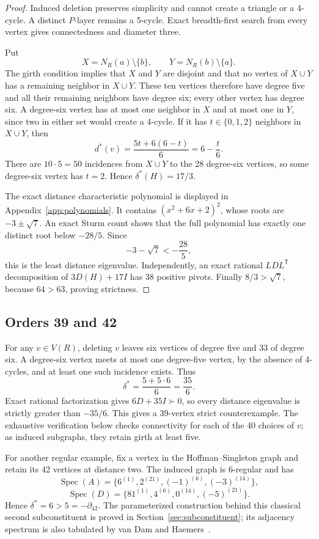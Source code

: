 \documentclass[a4paper,11pt,reqno]{amsart}
\theoremstyle{plain}
\theoremstyle{definition}
\theoremstyle{remark}
\newcommand{\Spec}{\operatorname{Spec}}
\begin{document}
\begin{proof}
Induced deletion preserves simplicity and cannot create a triangle or a
4-cycle.  A distinct \(P\)-layer remains a 5-cycle.  Exact breadth-first
search from every vertex gives connectedness and diameter three.

Put
\[
 X=N_R(a)\setminus\{b\},\qquad
 Y=N_R(b)\setminus\{a\}.
\]
The girth condition implies that \(X\) and \(Y\) are disjoint and that no
vertex of \(X\cup Y\) has a remaining neighbor in \(X\cup Y\).  These ten
vertices therefore have degree five and all their remaining neighbors have
degree six; every other vertex has degree six.  A degree-six vertex has at
most one neighbor in \(X\) and at most one in \(Y\), since two in either set
would create a 4-cycle.  If it has \(t\in\{0,1,2\}\) neighbors in
\(X\cup Y\), then
\[
 d^*(v)=\frac{5t+6(6-t)}6=6-\frac{t}{6}.
\]
There are \(10\cdot5=50\) incidences from \(X\cup Y\) to the 28 degree-six
vertices, so some degree-six vertex has \(t=2\).  Hence
\(\delta^*(H)=17/3\).

The exact distance characteristic polynomial is displayed in
Appendix~\ref{app:polynomials}.  It contains \((x^2+6x+2)^2\), whose roots
are \(-3\pm\sqrt7\).  An exact Sturm count shows that the full polynomial has
exactly one distinct root below \(-28/5\).  Since
\[
 -3-\sqrt7<-\frac{28}{5},
\]
this is the least distance eigenvalue.  Independently, an exact rational
\(LDL^{\mathsf T}\) decomposition of \(3D(H)+17I\) has 38 positive pivots.
Finally \(8/3>\sqrt7\), because \(64>63\), proving strictness.
\end{proof}

\subsection{Orders 39 and 42}

For any \(v\in V(R)\), deleting \(v\) leaves six vertices of degree five and
33 of degree six.  A degree-six vertex meets at most one degree-five vertex,
by the absence of 4-cycles, and at least one such incidence exists.  Thus
\[
 \delta^*=\frac{5+5\cdot6}{6}=\frac{35}{6}.
\]
Exact rational factorization gives \(6D+35I\succ0\), so every distance
eigenvalue is strictly greater than \(-35/6\).  This gives a 39-vertex strict
counterexample.  The exhaustive verification below checks connectivity for
each of the 40 choices of \(v\); as induced subgraphs, they retain girth at
least five.

For another regular example, fix a vertex in the Hoffman--Singleton graph and
retain its 42 vertices at distance two.  The induced graph is 6-regular and
has
\[
 \Spec(A)=\{6^{(1)},2^{(21)},(-1)^{(6)},(-3)^{(14)}\},
\]
\[
 \Spec(D)=\{81^{(1)},4^{(6)},0^{(14)},(-5)^{(21)}\}.
\]
Hence \(\delta^*=6>5=-\partial_{42}\).  The parameterized construction
behind this classical second subconstituent is proved in
Section~\ref{sec:subconstituent}; its adjacency spectrum is also tabulated by
van Dam and Haemers~\cite[Table~3]{vanDamHaemers2003}.
\end{document}
